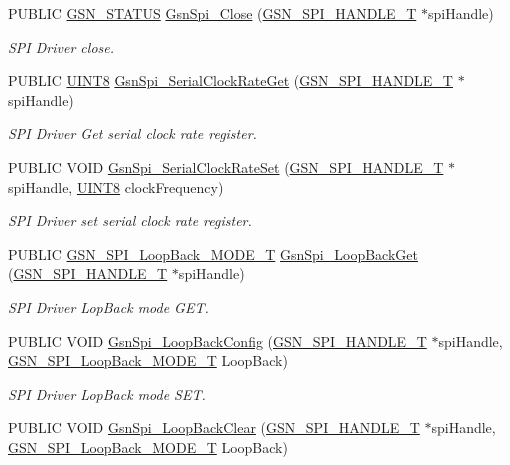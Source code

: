 \begin{DoxyCompactItemize}
PUBLIC \hyperlink{a00660_gada5951904ac6110b1fa95e51a9ddc217}{GSN\_\-STATUS} \hyperlink{a00655_gad8d545c582e8ac1fbaa9f57286fd62f8}{GsnSpi\_\-Close} (\hyperlink{a00238}{GSN\_\-SPI\_\-HANDLE\_\-T} $\ast$spiHandle)
\begin{DoxyCompactList}\small\item\em SPI Driver close. \end{DoxyCompactList}\item 
PUBLIC \hyperlink{a00660_gab27e9918b538ce9d8ca692479b375b6a}{UINT8} \hyperlink{a00655_ga2970481689a2602c56926842d790c1a9}{GsnSpi\_\-SerialClockRateGet} (\hyperlink{a00238}{GSN\_\-SPI\_\-HANDLE\_\-T} $\ast$spiHandle)
\begin{DoxyCompactList}\small\item\em SPI Driver Get serial clock rate register. \end{DoxyCompactList}\item 
PUBLIC VOID \hyperlink{a00655_ga3543dc0b4d7a29a37ab1cc4ea82945cb}{GsnSpi\_\-SerialClockRateSet} (\hyperlink{a00238}{GSN\_\-SPI\_\-HANDLE\_\-T} $\ast$spiHandle, \hyperlink{a00660_gab27e9918b538ce9d8ca692479b375b6a}{UINT8} clockFrequency)
\begin{DoxyCompactList}\small\item\em SPI Driver set serial clock rate register. \end{DoxyCompactList}\item 
PUBLIC \hyperlink{a00655_ga6f83091cbd86860cdb531eb6c520660e}{GSN\_\-SPI\_\-LoopBack\_\-MODE\_\-T} \hyperlink{a00655_ga628f6d407adb229afca1dc8b1ff7ed75}{GsnSpi\_\-LoopBackGet} (\hyperlink{a00238}{GSN\_\-SPI\_\-HANDLE\_\-T} $\ast$spiHandle)
\begin{DoxyCompactList}\small\item\em SPI Driver LopBack mode GET. \end{DoxyCompactList}\item 
PUBLIC VOID \hyperlink{a00655_gad0fe77483576e7fb04fc15907618813a}{GsnSpi\_\-LoopBackConfig} (\hyperlink{a00238}{GSN\_\-SPI\_\-HANDLE\_\-T} $\ast$spiHandle, \hyperlink{a00655_ga6f83091cbd86860cdb531eb6c520660e}{GSN\_\-SPI\_\-LoopBack\_\-MODE\_\-T} LoopBack)
\begin{DoxyCompactList}\small\item\em SPI Driver LopBack mode SET. \end{DoxyCompactList}\item 
PUBLIC VOID \hyperlink{a00655_ga3114ebc38924cb941ab5160f673e613e}{GsnSpi\_\-LoopBackClear} (\hyperlink{a00238}{GSN\_\-SPI\_\-HANDLE\_\-T} $\ast$spiHandle, \hyperlink{a00655_ga6f83091cbd86860cdb531eb6c520660e}{GSN\_\-SPI\_\-LoopBack\_\-MODE\_\-T} LoopBack)

\end{DoxyCompactItemize}
